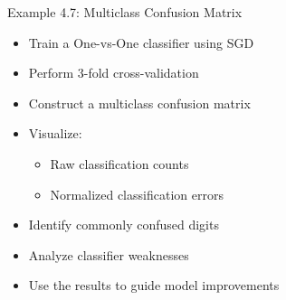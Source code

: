\documentclass[aspectratio=169]{beamer}
\begin{document}

\begin{frame}{Example 4.7: Multiclass Confusion Matrix}
	
	\begin{itemize}
		\item Train a One-vs-One classifier using SGD
		\item Perform 3-fold cross-validation
		\item Construct a multiclass confusion matrix
		\item Visualize:
		\begin{itemize}
			\item Raw classification counts
			\item Normalized classification errors
		\end{itemize}
		
		\vspace{0.5em}
		
		\item Identify commonly confused digits
		\item Analyze classifier weaknesses
		\item Use the results to guide model improvements
	\end{itemize}
	
\end{frame}
\end{document}
